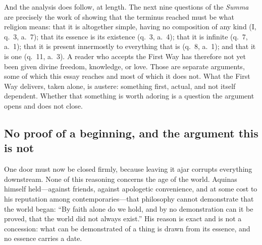 And the analysis does follow, at length. The next nine questions of the \emph{Summa} are precisely the work of showing that the terminus reached must be what religion means: that it is altogether simple, having no composition of any kind (I, q.~3, a.~7); that its essence is its existence (q.~3, a.~4); that it is infinite (q.~7, a.~1); that it is present innermostly to everything that is (q.~8, a.~1); and that it is one (q.~11, a.~3). A reader who accepts the First Way has therefore not yet been given divine freedom, knowledge, or love. Those are separate arguments, some of which this essay reaches and most of which it does not. What the First Way delivers, taken alone, is austere: something first, actual, and not itself dependent. Whether that something is worth adoring is a question the argument opens and does not close.

\subsection{No proof of a beginning, and the argument this is not}

One door must now be closed firmly, because leaving it ajar corrupts everything downstream. None of this reasoning concerns the age of the world. Aquinas himself held---against friends, against apologetic convenience, and at some cost to his reputation among contemporaries---that philosophy cannot demonstrate that the world began: ``By faith alone do we hold, and by no demonstration can it be proved, that the world did not always exist.'' His reason is exact and is not a concession: what can be demonstrated of a thing is drawn from its essence, and no essence carries a date.

